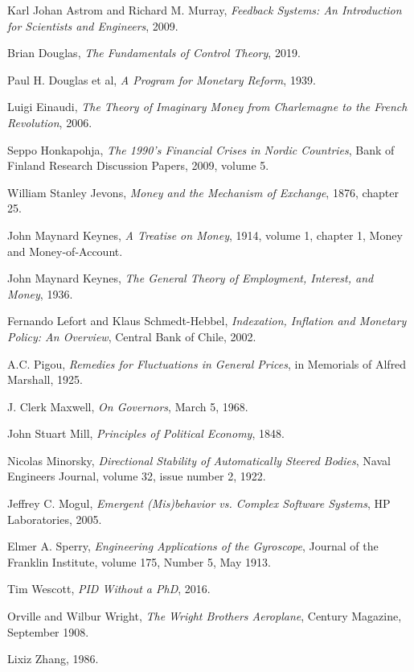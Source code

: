 \begin{thebibliography}{9}
    Karl Johan Astrom and Richard M. Murray,
    \emph{Feedback Systems: An Introduction for Scientists and Engineers},
    2009.

    Brian Douglas,
    \emph{The Fundamentals of Control Theory},
    2019.

    Paul H. Douglas et al,
    \emph{A Program for Monetary Reform},
    1939.

    Luigi Einaudi,
    \emph{The Theory of Imaginary Money from Charlemagne to the French Revolution},
    2006.

    Seppo Honkapohja,
    \emph{The 1990's Financial Crises in Nordic Countries},
    Bank of Finland Research Discussion Papers,
    2009,
    volume 5.

    William Stanley Jevons,
    \emph{Money and the Mechanism of Exchange},
    1876,
    chapter 25.

    John Maynard Keynes,
    \emph{A Treatise on Money},
    1914,
    volume 1,
    chapter 1,
    Money and Money-of-Account.

    John Maynard Keynes,
    \emph{The General Theory of Employment, Interest, and Money},
    1936.

    Fernando Lefort and Klaus Schmedt-Hebbel,
    \emph{Indexation, Inflation and Monetary Policy: An Overview},
    Central Bank of Chile,
    2002.

    A.C. Pigou,
    \emph{Remedies for Fluctuations in General Prices},
    in Memorials of Alfred Marshall,
    1925.

    J. Clerk Maxwell,
    \emph{On Governors},
    March 5, 1968.

    John Stuart Mill,
    \emph{Principles of Political Economy},
    1848.

    Nicolas Minorsky,
    \emph{Directional Stability of Automatically Steered Bodies},
    Naval Engineers Journal,
    volume 32,
    issue number 2,
    1922.

    Jeffrey C. Mogul,
    \emph{Emergent (Mis)behavior vs. Complex Software Systems},
    HP Laboratories,
    2005.

    Elmer A. Sperry,
    \emph{Engineering Applications of the Gyroscope},
    Journal of the Franklin Institute,
    volume 175,
    Number 5,
    May 1913.

    Tim Wescott,
    \emph{PID Without a PhD},
    2016.

    Orville and Wilbur Wright,
    \emph{The Wright Brothers Aeroplane},
    Century Magazine,
    September 1908.

    Lixiz Zhang,
    1986.

\end{thebibliography}


